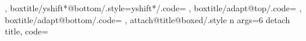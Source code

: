 {{{  }},
  boxtitle/yshift*@bottom/.style={yshift*/.code={%
    \tcbdimto{}%
    \tcbdimto\kvtcb@yinnershift@boxedtitle{\kvtcb@yshift@boxedtitle-\kvtcb@bottom@rule@stand}%
    \ifdim\dimexpr\kvtcb@yinnershift@boxedtitle<0pt\relax\let\kvtcb@yinnershift@boxedtitle\tcb@zpt\fi%
  }},
  boxtitle/adapt@top/.code={%
    \ifdim\dimexpr\tcboxedtitleheight+\kvtcb@yshift@boxedtitle>0pt\relax%
      \tcbdimto\kvtcb@bbtop@stand{\kvtcb@bbtop@stand+\tcboxedtitleheight+\kvtcb@yshift@boxedtitle}%
    \fi%
    \tcbdimto\kvtcb@top{\kvtcb@top-\kvtcb@yinnershift@boxedtitle}%
  },
  boxtitle/adapt@bottom/.code={%
    \ifdim\dimexpr\tcboxedtitleheight-\kvtcb@yshift@boxedtitle>0pt\relax%
      \tcbdimto\kvtcb@bbbottom@stand{\kvtcb@bbbottom@stand+\tcboxedtitleheight-\kvtcb@yshift@boxedtitle}%
    \fi%
    \tcbdimto\kvtcb@bottom{\kvtcb@bottom+\kvtcb@yinnershift@boxedtitle}%
  },
  attach@title@boxed/.style n args={6}{%
    detach title,
    code={\def\tcb@specialtitle@hook{%
      \ifx\tcbtitletext\@empty\else%
      \tcb@trans@set@boxedsize{#2}%
      \colorlet{tcbtranscol@frame}{tcbcolframe}%
      \colorlet{tcbtranscol@back}{tcbcolbacktitle}%
      \let\tcb@trans@skin@current\kvtcb@skin@current%
      \let\tcb@trans@boxedstyle\kvtcb@style@boxedtitle%
      \setbox\tcb@titlebox\color@hbox\bgroup\color{tcbcoltitle}\kvtcb@fonttitle\kvtcb@before@boxedtitle\kvtcb@haligntitle\tcb@insert@before@title\tcbtitletext\tcb@insert@after@title\kvtcb@after@boxedtitle\egroup\color@endbox%
      \setbox\tcb@titlebox\color@hbox\tcbox[skin=\tcb@trans@skin@current,colframe=tcbtranscol@frame,colback=tcbtranscol@back,%
          code={\pgfkeysalsofrom\tcb@trans@boxedsize\pgfkeysalsofrom\tcb@trans@boxedstyle%
            \ifcase#6
            \or%
              \global\tcbdimto\tcb@xshift@boxedtitle@delta{\kvtcb@left@rule+\kvtcb@boxsep+\kvtcb@leftupper}%
            \else%
              \global\tcbdimto\tcb@xshift@boxedtitle@delta{\kvtcb@right@rule+\kvtcb@boxsep+\kvtcb@rightupper}%
            \fi%
          }%
        ]{\box\tcb@titlebox}\color@endbox%
      \tcbdimto\tcboxedtitleheight{\ht\tcb@titlebox+\dp\tcb@titlebox}%
      \tcbdimto\tcboxedtitlewidth{\wd\tcb@titlebox}%
      \tcbset{boxtitle/.cd,xshift=0pt,yshift=0pt,yshifttext=0pt,yshift*@#2,#1,adapt@#2}%
      \let\tcb@specialgeonodes@first\relax%
      \let\tcb@specialgeonodes@middle\relax%
      \let\tcb@specialgeonodes@last\relax%
      \ifcase#6
        \tcbdimto\tcb@xshift@boxedtitle{\kvtcb@xshift@boxedtitle}%
      \or%
        \tcbdimto\tcb@xshift@boxedtitle{\kvtcb@left@rule+\kvtcb@boxsep+\kvtcb@leftupper-\tcb@xshift@boxedtitle@delta}%
}}}}
